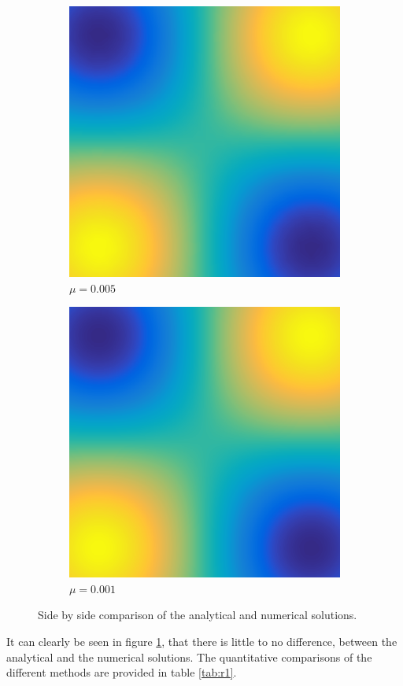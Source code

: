 \documentclass[../fem.tex]{subfile}
\begin{document}
\begin{figure}[htpb]
\begin{subfigure}{0.4\textwidth}
    \includegraphics[width=0.8\linewidth]{figures/r1c/approx.png}
    \caption{$\mu=0.005$}
  \end{subfigure}
  \begin{subfigure}{0.4\textwidth}
    \centering
    \includegraphics[width=0.8\linewidth]{figures/r1d/approx.png}
    \caption{$\mu=0.001$}
  \end{subfigure}
  \caption{Side by side comparison of the analytical and numerical solutions.}
  \label{fig:r1_soln}
\end{figure}

It can clearly be seen in figure \ref{fig:r1_soln}, that there is little to no
difference, between the analytical and the numerical solutions. The
quantitative comparisons of the different methods are provided in table
\ref{tab:r1}.
\end{document}
